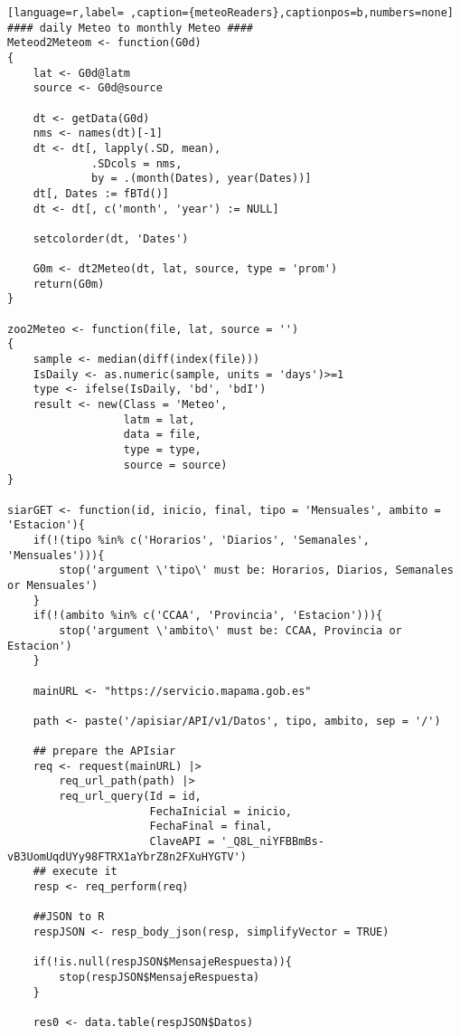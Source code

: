 \begin{lstlisting}[language=r,label= ,caption={meteoReaders},captionpos=b,numbers=none]
#### daily Meteo to monthly Meteo ####
Meteod2Meteom <- function(G0d)
{
    lat <- G0d@latm
    source <- G0d@source

    dt <- getData(G0d)
    nms <- names(dt)[-1]
    dt <- dt[, lapply(.SD, mean),
             .SDcols = nms,
             by = .(month(Dates), year(Dates))]
    dt[, Dates := fBTd()]
    dt <- dt[, c('month', 'year') := NULL]

    setcolorder(dt, 'Dates')

    G0m <- dt2Meteo(dt, lat, source, type = 'prom')
    return(G0m)
}

zoo2Meteo <- function(file, lat, source = '')
{
    sample <- median(diff(index(file)))
    IsDaily <- as.numeric(sample, units = 'days')>=1
    type <- ifelse(IsDaily, 'bd', 'bdI')
    result <- new(Class = 'Meteo',
                  latm = lat,
                  data = file,
                  type = type,
                  source = source)
}

siarGET <- function(id, inicio, final, tipo = 'Mensuales', ambito = 'Estacion'){
    if(!(tipo %in% c('Horarios', 'Diarios', 'Semanales', 'Mensuales'))){
        stop('argument \'tipo\' must be: Horarios, Diarios, Semanales or Mensuales')
    }
    if(!(ambito %in% c('CCAA', 'Provincia', 'Estacion'))){
        stop('argument \'ambito\' must be: CCAA, Provincia or Estacion')
    }

    mainURL <- "https://servicio.mapama.gob.es"

    path <- paste('/apisiar/API/v1/Datos', tipo, ambito, sep = '/')

    ## prepare the APIsiar
    req <- request(mainURL) |>
        req_url_path(path) |>
        req_url_query(Id = id,
                      FechaInicial = inicio,
                      FechaFinal = final,
                      ClaveAPI = '_Q8L_niYFBBmBs-vB3UomUqdUYy98FTRX1aYbrZ8n2FXuHYGTV')
    ## execute it
    resp <- req_perform(req)

    ##JSON to R
    respJSON <- resp_body_json(resp, simplifyVector = TRUE)

    if(!is.null(respJSON$MensajeRespuesta)){
        stop(respJSON$MensajeRespuesta)
    }

    res0 <- data.table(respJSON$Datos)


\end{lstlisting}
